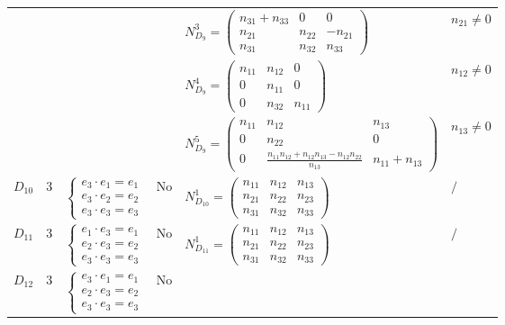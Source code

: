 \documentclass[12pt, reqno]{amsart}
\theoremstyle{plain}
\begin{document}
\begin{table}[H]
\begin{tabular}{|c|c|l|c|l|l|}
    & & & & $N_{D_9}^3 = \begin{pmatrix} n_{31}+n_{33} & 0 & 0 \\ n_{21} & n_{22} & -n_{21} \\ n_{31} & n_{32} & n_{33} \end{pmatrix}$ & $n_{21} \neq 0$ \\
    & & & & $N_{D_9}^4 = \begin{pmatrix} n_{11} & n_{12} & 0 \\ 0 & n_{11} & 0 \\ 0 & n_{32} & n_{11} \end{pmatrix}$ & $n_{12} \neq 0$ \\
    & & & & $N_{D_9}^5 = \begin{pmatrix} n_{11} & n_{12} & n_{13} \\ 0 & n_{22} & 0 \\ 0 & \frac{n_{11}n_{12}+n_{12}n_{13}-n_{12}n_{22}}{n_{13}} & n_{11}+n_{13} \end{pmatrix}$ & $n_{13} \neq 0$ \\
    \hline
    $D_{10}$ & 3 & $\begin{cases} e_3 \cdot e_1 = e_1 \\ e_3 \cdot e_2 = e_2 \\ e_3 \cdot e_3 = e_3 \end{cases}$ & No & 
    $N_{D_{10}}^1 = \begin{pmatrix} n_{11} & n_{12} & n_{13} \\ n_{21} & n_{22} & n_{23} \\ n_{31} & n_{32} & n_{33} \end{pmatrix}$ & $/$ \\
    \hline
    $D_{11}$ & 3 & $\begin{cases} e_1 \cdot e_3 = e_1 \\ e_2 \cdot e_3 = e_2 \\ e_3 \cdot e_3 = e_3 \end{cases}$ & No & 
    $N_{D_{11}}^1 = \begin{pmatrix} n_{11} & n_{12} & n_{13} \\ n_{21} & n_{22} & n_{23} \\ n_{31} & n_{32} & n_{33} \end{pmatrix}$ & $/$ \\
    \hline
    \multirow{5}{*}{$D_{12}$} & \multirow{5}{*}{3} & \multirow{5}{*}{$\begin{cases} e_3 \cdot e_1 = e_1 \\ e_2 \cdot e_3 = e_2 \\ e_3 \cdot e_3 = e_3 \end{cases}$} & \multirow{5}{*}{No} & 

\end{tabular}
\end{table}
\end{document}

